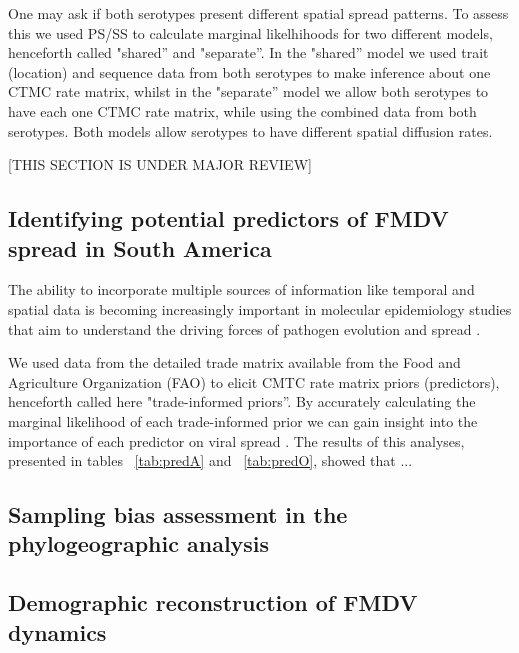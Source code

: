\documentclass[10pt]{article}
\begin{document}
One may ask if both serotypes present different spatial spread patterns.
To assess this we used PS/SS to calculate marginal likelhihoods for two different models, henceforth  called "shared'' and "separate''.
In the "shared'' model we used trait (location) and sequence data  from both serotypes to make inference about one CTMC rate matrix, whilst in the "separate'' model we allow both serotypes to have each one CTMC rate matrix, while using the combined data from both serotypes.
Both models allow serotypes to have different spatial diffusion rates.


\begin{center}
 [THIS SECTION IS UNDER MAJOR REVIEW]
\end{center}

\subsection*{Identifying potential predictors of FMDV spread in South America}
The ability to incorporate multiple sources of information like temporal and spatial data is becoming increasingly important in molecular epidemiology studies that aim to understand the driving forces of pathogen evolution and spread \cite{towards,combining,MEP,roots}. 

We used data from the detailed trade matrix available from the Food and Agriculture Organization (FAO) to elicit CMTC rate matrix priors (predictors), henceforth called here "trade-informed priors''.
By accurately calculating the marginal likelihood of each trade-informed prior we can gain insight into the importance of each predictor on viral spread \cite{Carvalho2012,Nelson2011}.
The results of this analyses, presented in tables ~\ref{tab:predA} and ~\ref{tab:predO}, showed that ... %


\subsection*{Sampling bias assessment in the phylogeographic analysis}

\subsection*{Demographic reconstruction of FMDV dynamics}
\end{document}
